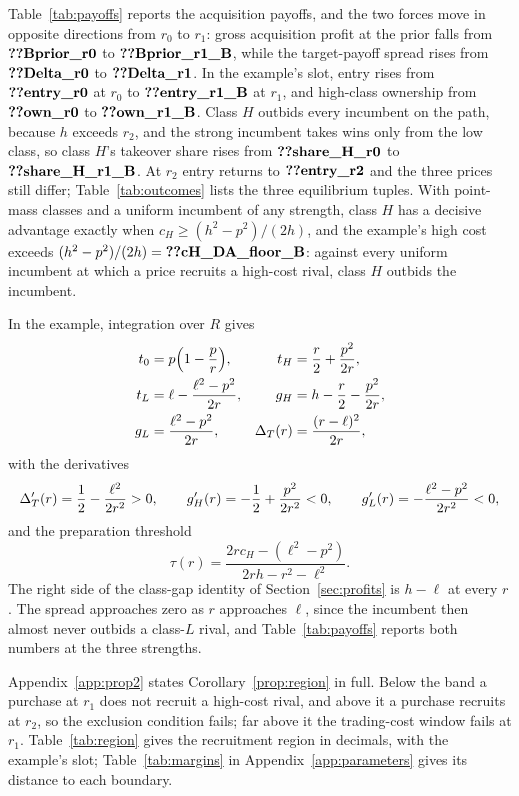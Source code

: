 Table~\ref{tab:payoffs} reports the acquisition payoffs, and the two forces move in opposite directions from \(r_0\)
to \(r_1\): gross acquisition profit at the prior falls from \(\reg{Bprior_r0}\) to \(\reg{Bprior_r1_B}\), while the
target-payoff spread rises from \(\reg{Delta_r0}\) to \(\reg{Delta_r1}\). In the example's slot, entry rises from
\(\reg{entry_r0}\) at \(r_0\) to \(\reg{entry_r1_B}\) at \(r_1\), and high-class ownership from \(\reg{own_r0}\) to
\(\reg{own_r1_B}\). Class \(H\) outbids every incumbent on the path, because \(h\) exceeds \(r_2\), and the strong
incumbent takes wins only from the low class, so class \(H\)'s takeover share rises from \(\reg{share_H_r0}\) to
\(\reg{share_H_r1_B}\). At \(r_2\) entry returns to \(\reg{entry_r2}\) and the three prices still differ;
Table~\ref{tab:outcomes} lists the three equilibrium tuples. With point-mass classes and a uniform incumbent of any
strength, class \(H\) has a decisive advantage exactly when \(c_H\ge(h^2-p^2)/(2h)\), and the example's high cost
exceeds \((h^2-p^2)/(2h)=\reg{cH_DA_floor_B}\): against every uniform incumbent at which a price recruits a
high-cost rival, class \(H\) outbids the incumbent.

In the example, integration over \(R\) gives
\begin{equation}\label{eq:payoffs}
\begin{aligned}
t_0&=p\Bigl(1-\frac pr\Bigr),&
t_H&=\frac r2+\frac{p^2}{2r},\\
t_L&=\ell-\frac{\ell^2-p^2}{2r},&
g_H&=h-\frac r2-\frac{p^2}{2r},\\
g_L&=\frac{\ell^2-p^2}{2r},&
\Delta_T(r)&=\frac{(r-\ell)^2}{2r},
\end{aligned}
\end{equation}
with the derivatives
\begin{equation}\label{eq:derivatives}
\Delta_T'(r)=\frac12-\frac{\ell^2}{2r^2}>0,\qquad
g_H'(r)=-\frac12+\frac{p^2}{2r^2}<0,\qquad
g_L'(r)=-\frac{\ell^2-p^2}{2r^2}<0,
\end{equation}
and the preparation threshold
\[
\tau(r)=\frac{2rc_H-(\ell^2-p^2)}{2rh-r^2-\ell^2}.
\]
The right side of the class-gap identity of Section~\ref{sec:profits} is \(h-\ell\) at every \(r\). The spread
approaches zero as \(r\) approaches \(\ell\), since the incumbent then almost never outbids a class-\(L\)
rival, and Table~\ref{tab:payoffs} reports both numbers at the three strengths.

Appendix~\ref{app:prop2} states Corollary~\ref{prop:region} in full. Below the band a purchase at \(r_1\) does not
recruit a high-cost rival, and above it a purchase recruits at \(r_2\), so the exclusion condition fails; far
above it the trading-cost window fails at \(r_1\). Table~\ref{tab:region} gives the recruitment region in decimals,
with the example's slot; Table~\ref{tab:margins} in Appendix~\ref{app:parameters} gives its distance to each
boundary.


